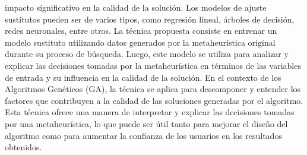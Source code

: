 impacto significativo en la calidad de la solución. Los modelos de ajuste sustitutos pueden ser de varios tipos, como regresión lineal, árboles de decisión, redes neuronales, entre otros. La técnica propuesta consiste en entrenar un modelo sustituto utilizando datos generados por la metaheurística original durante su proceso de búsqueda. Luego, este modelo se utiliza para analizar y explicar las decisiones tomadas por la metaheurística en términos de las variables de entrada y su influencia en la calidad de la solución. En el contexto de los Algoritmos Genéticos (GA), la técnica se aplica para descomponer y entender los factores que contribuyen a la calidad de las soluciones generadas por el algoritmo. Esta técnica ofrece una manera de interpretar y explicar las decisiones tomadas por una metaheurística, lo que puede ser útil tanto para mejorar el diseño del algoritmo como para aumentar la confianza de los usuarios en los resultados obtenidos.

